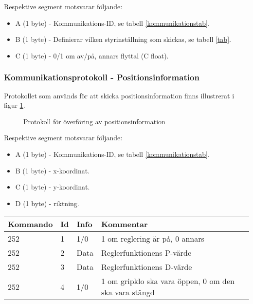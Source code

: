 \documentclass[11pt]{article}
\begin{document}
\begin{flushleft}
Respektive segment motsvarar följande: 
\begin{itemize}
	\item A (1 byte) - Kommunikations-ID, se tabell \ref{kommunikationstab}.
	\item B (1 byte) - Definierar vilken styrinställning som skickas, se tabell \ref{tab}.
	\item C (1 byte) - 0/1 om av/på, annars flyttal (C float).
\end{itemize}

\subsubsection{Kommunikationsprotokoll - Positionsinformation}
Protokollet som används för att skicka positionsinformation finns illustrerat i figur \ref{positionInfo}.

\begin{figure}[htbp]
\centering
\noindent\resizebox{.8\linewidth}{!}{
	}
	\caption{Protokoll för överföring av positionsinformation \label{positionInfo}}	
\end{figure}

Respektive segment motsvarar följande: 
\begin{itemize}
	\item A (1 byte) - Kommunikations-ID, se tabell \ref{kommunikationstab}.
	\item B (1 byte) - x-koordinat.
	\item C (1 byte) - y-koordinat.
	\item D (1 byte) - riktning.
\end{itemize}

\pagebreak

\begin{table}[h]
\begin{tabular}{|p{6em}|p{1em}|p{6em}|p{25em}|} \hline

\textbf{Kommando} & \textbf{Id} & \textbf{Info} & \textbf{Kommentar}\\ \hline

252 & 1 & 1/0 & 1 om reglering är på, 0 annars \\ \hline
252 & 2 & Data & Reglerfunktionens P-värde \\ \hline
252 & 3 & Data & Reglerfunktionens D-värde \\ \hline
252 & 4 & 1/0 & 1 om gripklo ska vara öppen, 0 om den ska vara stängd \\ \hline

\end{tabular}


\end{table}
\end{flushleft}
\end{document}
